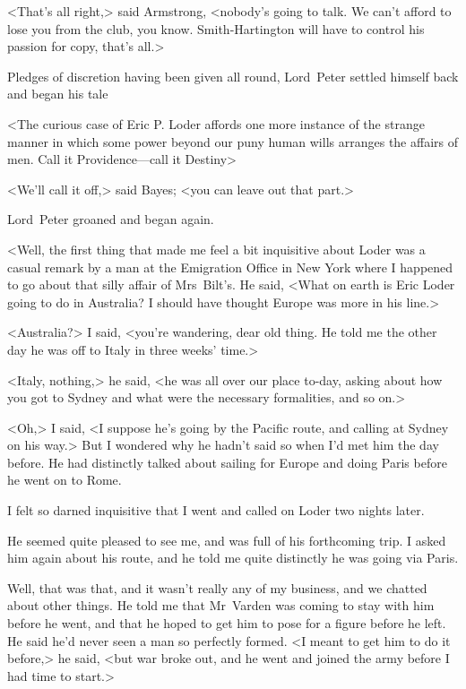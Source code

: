 <That's all right,> said Armstrong, <nobody's going to talk. We can't afford to lose you from the club, you know. Smith-Hartington will have to control his passion for copy, that's all.>

Pledges of discretion having been given all round, Lord~Peter settled himself back and began his tale

\divider

<The curious case of Eric P\@. Loder affords one more instance of the strange manner in which some power beyond our puny human wills arranges the affairs of men. Call it Providence—call it Destiny\longdash>

<We'll call it off,> said Bayes; <you can leave out that part.>

Lord~Peter groaned and began again.

<Well, the first thing that made me feel a bit inquisitive about Loder was a casual remark by a man at the Emigration Office in New York where I happened to go about that silly affair of Mrs~Bilt's. He said, <What on earth is Eric Loder going to do in Australia? I should have thought Europe was more in his line.>

<Australia?> I said, <you're wandering, dear old thing. He told me the other day he was off to Italy in three weeks' time.>

<Italy, nothing,> he said, <he was all over our place to-day, asking about how you got to Sydney and what were the necessary formalities, and so on.>

<Oh,> I said, <I suppose he's going by the Pacific route, and calling at Sydney on his way.> But I wondered why he hadn't said so when I'd met him the day before. He had distinctly talked about sailing for Europe and doing Paris before he went on to Rome.

I felt so darned inquisitive that I went and called on Loder two nights later.

He seemed quite pleased to see me, and was full of his forthcoming trip. I asked him again about his route, and he told me quite distinctly he was going via Paris.

Well, that was that, and it wasn't really any of my business, and we chatted about other things. He told me that Mr~Varden was coming to stay with him before he went, and that he hoped to get him to pose for a figure before he left. He said he'd never seen a man so perfectly formed. <I meant to get him to do it before,> he said, <but war broke out, and he went and joined the army before I had time to start.>


